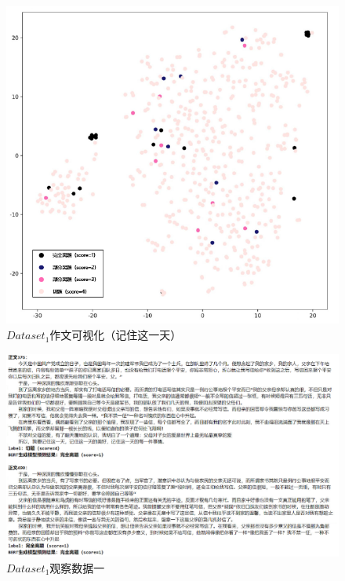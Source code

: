 \documentclass[11pt]{article}
\begin{document}
\begin{CJK}{UTF8}{gkai}
\begin{figure}[htbp]\small
  \centering
  \includegraphics[width=0.6\linewidth]{yl1.png}
  \caption{$Dataset_1$作文可视化（记住这一天）}
  \label{framework}
\end{figure}

\begin{figure}[htbp]\small
  \centering
  \includegraphics[width=1.0\linewidth]{zw1.png}
  \caption{$Dataset_1$观察数据一}
  \label{framework}
\end{figure}


\end{CJK}
\end{document}
